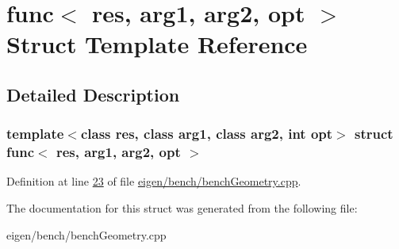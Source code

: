 \hypertarget{structfunc}{}\section{func$<$ res, arg1, arg2, opt $>$ Struct Template Reference}
\label{structfunc}


\subsection{Detailed Description}
\subsubsection*{template$<$class res, class arg1, class arg2, int opt$>$\newline
struct func$<$ res, arg1, arg2, opt $>$}



Definition at line \hyperlink{eigen_2bench_2bench_geometry_8cpp_source_l00023}{23} of file \hyperlink{eigen_2bench_2bench_geometry_8cpp_source}{eigen/bench/bench\+Geometry.\+cpp}.



The documentation for this struct was generated from the following file\+:\begin{DoxyCompactItemize}
\item 
eigen/bench/bench\+Geometry.\+cpp\end{DoxyCompactItemize}
